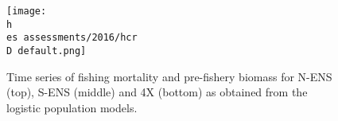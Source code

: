\documentclass[11pt]{article}
\newcommand{\D}{.}
\newcommand{\h}{\string~/}
\newcommand{\es}{bio.data/bio.snowcrab/}
\begin{document}
\begin{figure}
\centering
\texttt{[image: \\h \\es assessments/2016/hcr\\D default.png]}\\ 
\caption{Time series of fishing mortality and pre-fishery biomass for N-ENS (top), S-ENS (middle) and 4X (bottom) as obtained from the logistic population models.}
\end{figure}
\clearpage
%
%
%
\end{document}
